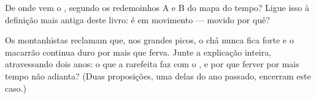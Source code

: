 \begin{exercise}[$\star\star$]\label{exo:g5:air-pressure-weather:10}
De onde vem o , segundo os redemoinhos A e B do mapa do tempo?
Ligue isso à definição mais antiga deste livro:  é  em
movimento --- movido por quê?
\end{exercise}

\begin{exercise}[$\star\star$]\label{exo:g5:air-pressure-weather:11}
Os montanhistas reclamam que, nos grandes picos, o chá nunca fica
forte e o macarrão continua duro por mais que ferva. Junte a
explicação inteira, atravessando dois anos: o que a 
rarefeita faz com o , e por que ferver por mais
tempo não adianta? (Duas proposições, uma delas do ano passado,
encerram este caso.)
\end{exercise}
